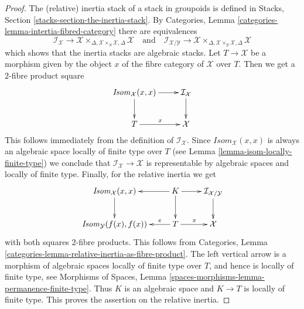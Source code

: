 \begin{proof}
The (relative) inertia stack of a stack in groupoids is defined in
Stacks, Section \ref{stacks-section-the-inertia-stack}.
By
Categories, Lemma \ref{categories-lemma-intertia-fibred-category}
there are equivalences
$$
\mathcal{I}_{\mathcal{X}} \to
\mathcal{X} \times_{\Delta, \mathcal{X} \times_S \mathcal{X}, \Delta}
\mathcal{X}
\quad\text{and}\quad
\mathcal{I}_{\mathcal{X}/\mathcal{Y}} \to
\mathcal{X}
\times_{\Delta, \mathcal{X} \times_{\mathcal{Y}} \mathcal{X}, \Delta}
\mathcal{X}
$$
which shows that the inertia stacks are algebraic stacks.
Let $T \to \mathcal{X}$ be a morphism given by
the object $x$ of the fibre category of $\mathcal{X}$ over $T$.
Then we get a $2$-fibre product square
$$
\xymatrix{
\mathit{Isom}_{\mathcal{X}}(x, x) \ar[d] \ar[r] &
\mathcal{I}_{\mathcal{X}} \ar[d] \\
T \ar[r]^x & \mathcal{X}
}
$$
This follows immediately from the definition of $\mathcal{I}_{\mathcal{X}}$.
Since $\mathit{Isom}_{\mathcal{X}}(x, x)$ is always an algebraic space
locally of finite type over $T$ (see
Lemma \ref{lemma-isom-locally-finite-type})
we conclude that $\mathcal{I}_{\mathcal{X}} \to \mathcal{X}$ is representable
by algebraic spaces and locally of finite type. Finally, for
the relative inertia we get
$$
\vcenter{
\xymatrix{
\mathit{Isom}_{\mathcal{X}}(x, x) \ar[d] &
K \ar[l] \ar[d] \ar[r] &
\mathcal{I}_{\mathcal{X}/\mathcal{Y}} \ar[d] \\
\mathit{Isom}_{\mathcal{Y}}(f(x), f(x)) &
T \ar[l]_-e \ar[r]^x & \mathcal{X}
}
}
$$
with both squares $2$-fibre products. This follows from
Categories, Lemma \ref{categories-lemma-relative-inertia-as-fibre-product}.
The left vertical arrow is a morphism of algebraic spaces locally of finite
type over $T$, and hence is locally of finite type, see
Morphisms of Spaces,
Lemma \ref{spaces-morphisms-lemma-permanence-finite-type}.
Thus $K$ is an algebraic space and $K \to T$ is locally of finite type.
This proves the assertion on the relative inertia.
\end{proof}

